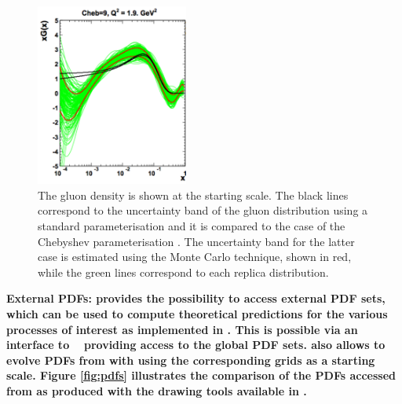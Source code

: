 \begin{description}
\begin{figure}[!ht]
 \centering
  \includegraphics[width=5cm]{chebishev.pdf}
  \caption{The gluon density is shown at the starting scale. The black lines correspond to the uncertainty band of the gluon distribution using a standard parameterisation and it is compared to the case of the Chebyshev parameterisation \cite{Chebyshev}. The uncertainty band for the latter case is estimated using the Monte Carlo technique, shown in red, while the  green lines correspond to each replica distribution.}
 \label{fig:cheb}
\end{figure}

%
\item \bf{External PDFs:} \rm 
 \fitter provides the possibility to access external PDF sets, which can be used to compute 
theoretical predictions for the various processes of interest as implemented in \fitter. 
This is possible via an interface to \lhapdf~\cite{lhapdf,lhapdfweb} providing access to the 
global PDF sets.
\fitter also allows to evolve PDFs from \lhapdf with \qcdnum using the corresponding grids as a starting scale.
Figure \ref{fig:pdfs} illustrates the comparison of the PDFs accessed from \lhapdf as produced with the drawing 
tools available in \fitter.
\end{description}
%

